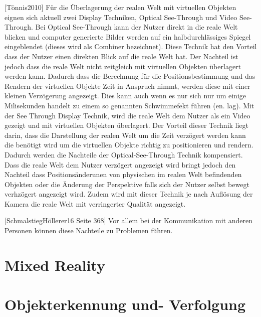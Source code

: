 [Tönnis2010] Für die Überlagerung der realen Welt mit virtuellen Objekten eignen sich aktuell zwei Display Techniken,  Optical See-Through und Video See-Through. 
Bei Optical See-Through kann der Nutzer direkt in die reale Welt blicken und computer generierte Bilder werden auf ein halbdurchlässiges Spiegel eingeblendet (dieses wird als Combiner bezeichnet).
Diese Technik hat den Vorteil dass der Nutzer einen direkten Blick auf die reale Welt hat. Der Nachteil ist jedoch dass die reale Welt nicht zeitgleich mit virtuellen Objekten überlagert werden kann. 
Dadurch dass die Berechnung für die Positionsbestimmung und das Rendern der virtuellen Objekte Zeit in Anspruch nimmt, werden diese mit einer kleinen Verzögerung angezeigt. Dies kann auch 
wenn es nur sich nur um einige Milisekunden handelt zu einem so genannten Schwimmefekt führen (en. lag). Mit der See Through Display Technik, wird die reale Welt dem Nutzer als ein Video 
gezeigt und mit virtuellen Objekten überlagert. Der Vorteil dieser Technik liegt darin, dass die Darstellung der realen Welt um die Zeit verzögert werden kann die benötigt wird um die virtuellen Objekte 
richtig zu positionieren und rendern. Dadurch werden die Nachteile der Optical-See-Through Technik kompensiert. Dass die reale Welt dem Nutzer verzögert angezeigt wird bringt jedoch den Nachteil 
dass Positionsänderunen von physischen im realen Welt befindenden Objekten oder die Änderung der Perspektive falls sich der Nutzer selbst bewegt verhzögert angezeigt wird. Zudem wird mit 
dieser Technik je nach Auflösung der Kamera die reale Welt mit verringerter Qualität angezeigt.

[SchmalstiegHöllerer16 Seite 368] Vor allem bei der Kommunikation mit anderen Personen können diese Nachteile zu Problemen führen. 

\section{Mixed Reality}



\section{Objekterkennung und- Verfolgung}


